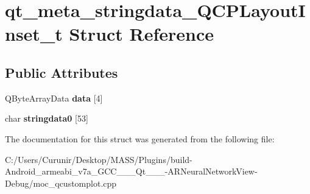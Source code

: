 \hypertarget{structqt__meta__stringdata___q_c_p_layout_inset__t}{}\section{qt\+\_\+meta\+\_\+stringdata\+\_\+\+Q\+C\+P\+Layout\+Inset\+\_\+t Struct Reference}
\label{structqt__meta__stringdata___q_c_p_layout_inset__t}
\subsection*{Public Attributes}
\begin{DoxyCompactItemize}
\item 
\mbox{\label{structqt__meta__stringdata___q_c_p_layout_inset__t_a5b2b19421e0f2647557bdb80a4476815}} 
Q\+Byte\+Array\+Data {\bfseries data} \mbox{[}4\mbox{]}
\item 
\mbox{\label{structqt__meta__stringdata___q_c_p_layout_inset__t_a3ac2f06acb2735574bf93cb290b76095}} 
char {\bfseries stringdata0} \mbox{[}53\mbox{]}
\end{DoxyCompactItemize}


The documentation for this struct was generated from the following file\+:\begin{DoxyCompactItemize}
\item 
C\+:/\+Users/\+Curunir/\+Desktop/\+M\+A\+S\+S/\+Plugins/build-\/\+Android\+\_\+armeabi\+\_\+v7a\+\_\+\+G\+C\+C\+\_\+\_\+\_\+\+Qt\+\_\+\_\+\_-\/\+A\+R\+Neural\+Network\+View-\/\+Debug/moc\+\_\+qcustomplot.\+cpp\end{DoxyCompactItemize}
